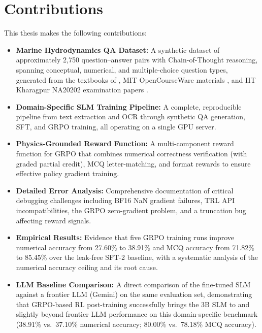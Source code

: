 \documentclass[12pt]{report}
\begin{document}
\section{Contributions}

This thesis makes the following contributions:

\begin{itemize}
    \item \textbf{Marine Hydrodynamics QA Dataset:} A synthetic dataset of approximately 2,750 question--answer pairs with Chain-of-Thought reasoning, spanning conceptual, numerical, and multiple-choice question types, generated from the textbooks of \citet{newman1977marine,faltinsen1993sea}, MIT OpenCourseWare materials \citep{mitocw220,mitocw229}, and IIT Kharagpur NA20202 examination papers \citep{iitkgp_na20202_exams}.
    
    \item \textbf{Domain-Specific SLM Training Pipeline:} A complete, reproducible pipeline from text extraction and OCR through synthetic QA generation, SFT, and GRPO training, all operating on a single GPU server.
    
    \item \textbf{Physics-Grounded Reward Function:} A multi-component reward function for GRPO that combines numerical correctness verification (with graded partial credit), MCQ letter-matching, and format rewards to ensure effective policy gradient training.
    
    \item \textbf{Detailed Error Analysis:} Comprehensive documentation of critical debugging challenges including BF16 NaN gradient failures, TRL API incompatibilities, the GRPO zero-gradient problem, and a truncation bug affecting reward signals.
    
    \item \textbf{Empirical Results:} Evidence that five GRPO training runs improve numerical accuracy from 27.60\% to 38.91\% and MCQ accuracy from 71.82\% to 85.45\% over the leak-free SFT-2 baseline, with a systematic analysis of the numerical accuracy ceiling and its root cause.
    
    \item \textbf{LLM Baseline Comparison:} A direct comparison of the fine-tuned SLM against a frontier LLM (Gemini) on the same evaluation set, demonstrating that GRPO-based RL post-training successfully brings the 3B SLM to and slightly beyond frontier LLM performance on this domain-specific benchmark (38.91\% vs.\ 37.10\% numerical accuracy; 80.00\% vs.\ 78.18\% MCQ accuracy).
\end{itemize}
\end{document}

